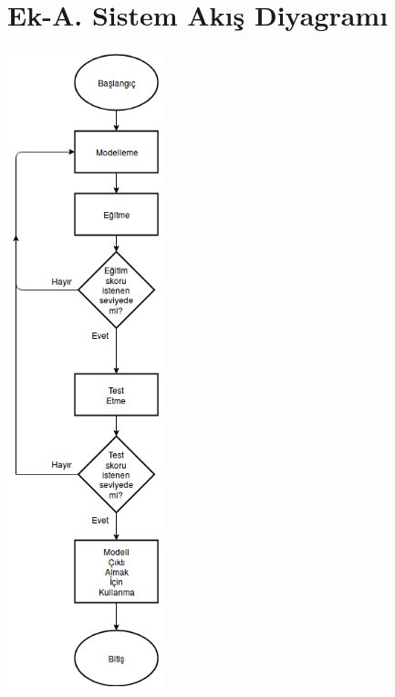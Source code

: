 \documentclass[12pt,a4paper]{article}
\begin{document}
   \section{Ek-A. Sistem Akış Diyagramı} \label{fc}
      \begin{center}
         \includegraphics[width=170px]{res/fc.png}
      \end{center}
\end{document}
